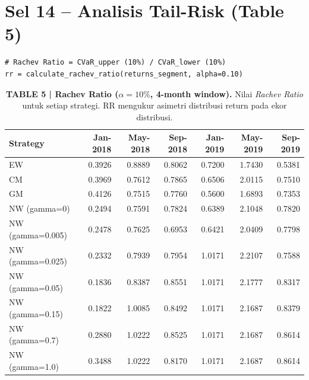 \documentclass[12pt,a4paper]{article}
\begin{document}
\section{Sel 14 -- Analisis Tail-Risk (Table 5)}

\begin{lstlisting}[caption={Kalkulasi Rachev Ratio Periodik}]
# Rachev Ratio = CVaR_upper (10%) / CVaR_lower (10%)
rr = calculate_rachev_ratio(returns_segment, alpha=0.10)
\end{lstlisting}

\begin{table}[h!]
    \centering
    \footnotesize
    \setlength{\tabcolsep}{4pt}
    \caption{\textbf{TABLE 5 | Rachev Ratio ($\alpha=10\%$, 4-month window).} Nilai \textit{Rachev Ratio} untuk setiap strategi. RR mengukur asimetri distribusi return pada ekor distribusi.}
    \begin{tabular}{lrrrrrr}
        \toprule
        \textbf{Strategy} & \textbf{Jan-2018} & \textbf{May-2018} & \textbf{Sep-2018} & \textbf{Jan-2019} & \textbf{May-2019} & \textbf{Sep-2019} \\
        \midrule
        EW                          & 0.3926 & 0.8889 & 0.8062 & 0.7200 & 1.7430 & 0.5381 \\
        CM                          & 0.3969 & 0.7612 & 0.7865 & 0.6506 & 2.0115 & 0.7510 \\
        GM                          & 0.4126 & 0.7515 & 0.7760 & 0.5600 & 1.6893 & 0.7353 \\
        NW (gamma=0)                & 0.2494 & 0.7591 & 0.7824 & 0.6389 & 2.1048 & 0.7820 \\
        NW (gamma=0.005)            & 0.2478 & 0.7625 & 0.6953 & 0.6421 & 2.0409 & 0.7798 \\
        NW (gamma=0.025)            & 0.2332 & 0.7939 & 0.7954 & 1.0171 & 2.2107 & 0.7588 \\
        NW (gamma=0.05)             & 0.1836 & 0.8387 & 0.8551 & 1.0171 & 2.1777 & 0.8317 \\
        NW (gamma=0.15)             & 0.1822 & 1.0085 & 0.8492 & 1.0171 & 2.1687 & 0.8379 \\
        NW (gamma=0.7)              & 0.2880 & 1.0222 & 0.8525 & 1.0171 & 2.1687 & 0.8614 \\
        NW (gamma=1.0)              & 0.3488 & 1.0222 & 0.8170 & 1.0171 & 2.1687 & 0.8614 \\

\end{tabular}
\end{table}
\end{document}
